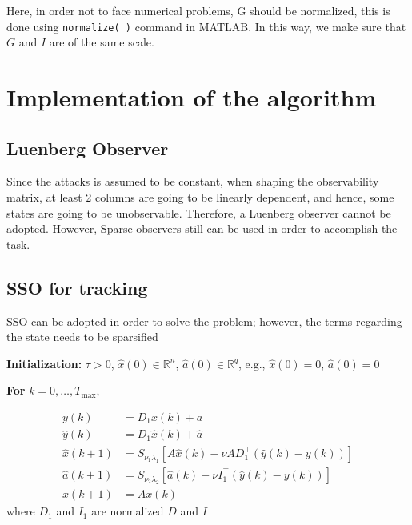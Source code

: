 Here, in order not to face numerical problems, G should be normalized, this is done using \texttt{normalize( )} command in MATLAB. In this way, we make sure that $G$ and $I$ are of the same scale.

\section{Implementation of the algorithm}
\subsection{Luenberg Observer}
Since the attacks is assumed to be constant, when shaping the observability matrix, at least 2 columns are going to be linearly dependent, and hence, some states are going to be unobservable. Therefore, a Luenberg observer cannot be adopted. However, Sparse observers still can be used in order to accomplish the task.

\subsection{SSO for tracking}
SSO can be adopted in order to solve the problem; however, the terms regarding the state needs to be sparsified

\textbf{Initialization:} \(\tau > 0\), \(\hat{x}(0) \in \mathbb{R}^{n}\), \(\hat{a}(0) \in \mathbb{R}^{q}\), e.g., \(\hat{x}(0) = 0\), \(\hat{a}(0) = 0\)

\textbf{For} \( k = 0, \dots, T_{\max} \),

\begin{align}
    y(k) &= D_1x(k) + a\\
    \hat{y}(k) &= D_1\hat{x}(k) + \hat{a}\\
    \hat{x}(k+1) &= S_{\nu_1\lambda_1} [A\hat{x}(k) - \nu A D_1^\top (\hat{y}(k) - y(k))] \\
    \hat{a}(k+1) &= S_{\nu_2\lambda_2} [\hat{a}(k) - \nu I_1^\top (\hat{y}(k) - y(k))] \\
    x(k+1) &= A x(k)
\end{align}
where $D_1$ and $I_1$ are normalized $D$ and $I$


